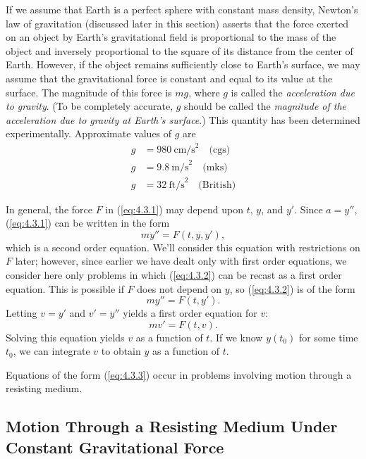 \documentclass{ximera}
\begin{document}
If we assume that Earth is a perfect sphere with constant mass
density,  Newton's law of gravitation (discussed later in this
section) asserts that the force exerted on an object by Earth's
gravitational field is proportional to the mass of the object and
inversely proportional to the square of its  distance from the
center of Earth. However, if the object remains sufficiently close to
Earth's surface, we may assume that the gravitational force is
constant and equal to its value at the surface. The magnitude of this
force is $mg$, where $g$ is called the \textit{acceleration due to
gravity}. (To be completely accurate, $g$ should be called the \textit{magnitude of the acceleration due to gravity at Earth's surface}.)
This quantity has been determined experimentally. Approximate
values of $g$  are
$$\begin{array}{rl}
g &=980\ \mbox{cm/s}^2\quad \mbox{(cgs)}   \\
g &=9.8\ \mbox{m/s}^2\quad \mbox{(mks)}   \\
g &=32\ \mbox{ft/s}^2\quad \mbox{(British)}
\end{array}$$

In general, the force $F$ in (\ref{eq:4.3.1}) may depend upon $t$, $y$, and
$y'$. Since $a=y''$,  (\ref{eq:4.3.1}) can be written in the
form
\begin{equation} \label{eq:4.3.2}
my''=F(t,y,y'),
\end{equation}
which is a second order equation. We'll consider this equation with
restrictions on $F$ later;     however, since earlier we have
dealt only with first order equations, we consider here only problems in
which (\ref{eq:4.3.2}) can be recast as a first order equation. This is
possible if $F$ does not depend on $y$, so (\ref{eq:4.3.2}) is of the form
$$
my''=F(t,y').
$$
 Letting $v=y'$ and $v'=y''$ yields a first order
equation for $v$:
\begin{equation} \label{eq:4.3.3}
mv'=F(t,v).
\end{equation}
Solving this equation yields $v$ as a function of $t$. If we know
$y(t_0)$ for some time $t_0$, we can  integrate $v$ to obtain $y$
as a function of $t$.

Equations of the form (\ref{eq:4.3.3}) occur in problems involving motion
through a resisting medium.



\subsection*{Motion Through a Resisting Medium Under Constant
Gravitational Force}
\end{document}
